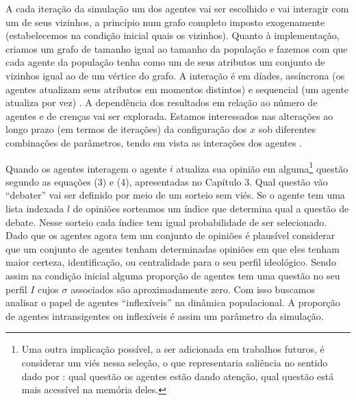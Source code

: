 A cada iteração da simulação um dos agentes vai ser escolhido e vai
interagir com um de seus vizinhos, a princípio num grafo completo imposto
exogenamente (estabelecemos na condição inicial quais os vizinhos). Quanto à
implementação, criamos um grafo de tamanho igual ao tamanho da população e
fazemos com que cada agente da população tenha como um de seus atributos um
conjunto de vizinhos igual ao de um vértice do grafo. A interação é em díades,
assíncrona (os agentes atualizam seus atributos em momentos distintos) e
sequencial (um agente atualiza por vez) \cite{wilensky2015introduction}. A
dependência dos resultados em relação ao número de agentes e de crenças vai ser
explorada. Estamos interessados nas alterações ao longo prazo (em termos de
iterações) da configuração dos \(x\) sob diferentes combinações de parâmetros,
tendo em vista as interações dos agentes \cite{acemoglu2011opinion}.

Quando os agentes interagem o agente \(i\) atualiza sua opinião em
alguma\footnote{ Uma outra implicação possível, a ser adicionada em trabalhos
  futuros, é considerar um viés nessa seleção, o que representaria saliência no
  sentido dado por : qual questão os agentes estão
  dando atenção, qual questão está mais acessível na memória deles.} questão
segundo as equações (3) e (4), apresentadas no Capítulo 3. Qual questão vão
``debater'' vai ser definido por meio de um sorteio sem viés. Se o agente tem
uma lista indexada \(l\) de opiniões sorteamos um índice que determina qual a
questão de debate. Nesse sorteio cada índice tem igual probabilidade de ser
selecionado. Dado que os agentes agora tem um conjunto de opiniões é plausível
considerar que um conjunto de agentes tenham determinadas opiniões em que eles
tenham maior certeza, identificação, ou centralidade para o seu perfil
ideológico. Sendo assim na condição inicial alguma proporção de agentes tem uma
questão no seu perfil \(I\) cujos \(\sigma\) associados são aproximadamente zero. Com
isso buscamos analisar o papel de agentes ``inflexíveis'' na dinâmica
populacional. A proporção de agentes intransigentes ou inflexíveis é assim um
parâmetro da simulação.

